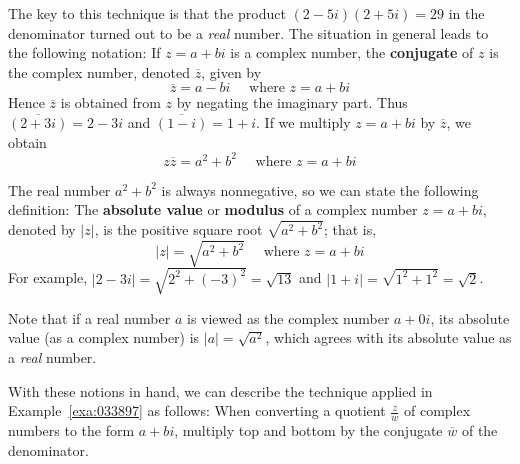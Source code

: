 The key to this technique is that the product $(2 - 5i)(2 + 5i) = 29$ in the denominator turned out to be a \textit{real} number. The situation in general leads to the following notation: If $z = a + bi$ is a complex number, the \textbf{conjugate} of $z$ is the complex number, denoted $\overline{z}$, given by
\begin{equation*}
\overline{z} = a-bi \quad \mbox{ where } z = a+bi
\end{equation*} 
Hence $\overline{z}$ is obtained from $z$ by negating the imaginary part. Thus $\overline{(2+3i)} = 2-3i$ and  $\overline{(1-i)} = 1+i$. If we multiply $z = a + bi$ by $\overline{z}$, we obtain
\begin{equation*}
z \overline{z} = a^2 + b^2 \quad \mbox{ where } z = a+bi
\end{equation*}

The real number $a^{2} + b^{2}$ is always nonnegative, so we can state the following definition: The \textbf{absolute value} or \textbf{modulus} of a complex number $z = a + bi$, denoted by $|z|$, is the positive square root $\sqrt{a^2 + b^2}$; that is,
\begin{equation*}
|z| = \sqrt{a^2 + b^2} \quad \mbox{ where } z = a+bi
\end{equation*}
For example, $| 2-3i| = \sqrt{2^2 + (-3)^2} = \sqrt{13}$
 and $| 1+i| = \sqrt{1^2 + 1^2} = \sqrt{2}$.


Note that if a real number $a$ is viewed as the complex number $a + 0i$, its absolute value (as a complex number) is $|a| = \sqrt{a^2}$, which agrees with its absolute value as a \textit{real} number.


With these notions in hand, we can describe the technique applied in Example~\ref{exa:033897}  as follows: When converting a quotient $\frac{z}{w}$
 of complex numbers to the form $a + bi$, multiply top and bottom by the conjugate  $\overline{w}$ of the denominator.

